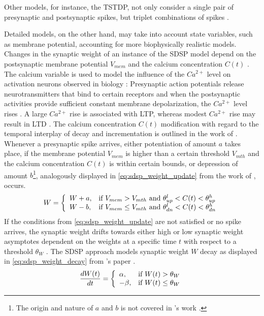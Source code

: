 Other models, for instance, the \ac{TSTDP}, not only consider a single pair of presynaptic and postsynaptic spikes, 
but triplet combinations of spikes \cite{Synaptic_plasticity,STDP_triplet}.

Detailed models, on the other hand, may take into account state variables, such as membrane potential, 
accounting for more biophysically realistic models.
Changes in the synaptic weight of an instance of the \ac{SDSP} model depend on the postsynaptic membrane potential $V_{mem}$ and 
the calcium concentration $C(t)$ \cite{Synaptic_plasticity}.
The calcium variable is used to model the influence of the $Ca^{2+}$ level on activation neurons observed in biology \cite{STDP_hebbian}:
Presynaptic action potentials release neurotransmitters that bind to certain receptors and 
when the postsynaptic activities provide sufficient constant membrane depolarization, the $Ca^{2+}$ level rises \cite{Synaptic_plasticity}.
A large $Ca^{2+}$ rise is associated with \ac{LTP}, whereas modest $Ca^{2+}$ rise may result in \ac{LTD} \cite{STDP_hebbian}.
The calcium concentration $C(t)$  modification with regard to the temporal interplay of decay and incrementation is outlined in the work 
of \authorssimulationSTDP{} \cite{simulation_STDP}.
Whenever a presynaptic spike arrives, either potentiation of amount $a$ takes place, 
if the membrane potential $V_{mem}$ is higher than a certain threshold $V_{mth}$ and the 
calcium concentration $C(t)$ is within certain bounds, 
or depression of amount $b$\footnote{The origin and nature of $a$ and $b$ is not covered in \authorsSynapticPlasticity{}'s work \cite{Synaptic_plasticity}.}, analogously displayed in 
\autoref{eq:sdsp_weight_update} from the work of \authorsSynapticPlasticity{} \cite{Synaptic_plasticity}, occurs.
%
\begin{equation}
    \centering
    \label{eq:sdsp_weight_update} 
    W = 
    \left\{
    \begin{array}{ll}
        W + a, & \text{if } V_{mem} > V_{mth} \text{ and } \theta^l_{up} < C(t) < \theta^h_{up}\\
        W - b, & \text{if } V_{mem} \le V_{mth} \text{ and } \theta^l_{dn} < C(t) < \theta^h_{dn}
    \end{array}
    \right.
\end{equation}
%
If the conditions from \autoref{eq:sdsp_weight_update} are not satisfied or no spike arrives, 
the synaptic weight drifts towards either high or low synaptic weight asymptotes dependent on the weights at a specific time $t$ 
with respect to a threshold $\theta_W$ \cite{Synaptic_plasticity}.
The \ac{SDSP} approach models synaptic weight $W$ decay as displayed in \autoref{eq:sdsp_weight_decay} from \authorsSynapticPlasticity{}'s paper \cite{Synaptic_plasticity}.
%
\begin{equation}
    \centering
    \label{eq:sdsp_weight_decay}
    \frac{dW(t)}{dt} = 
    \left\{
    \begin{array}{ll}
        \alpha, & \text{if } W(t) > \theta_W\\
        - \beta, & \text{if } W(t) \le \theta_W\\
    \end{array}
    \right.
\end{equation}

